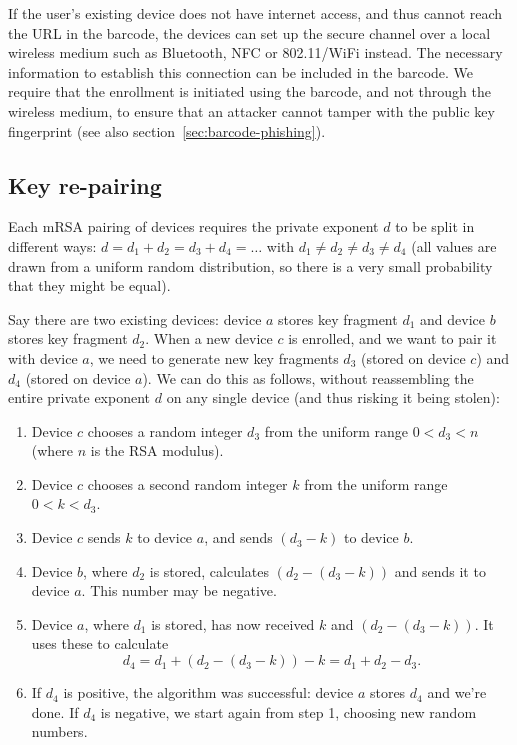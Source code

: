 If the user's existing device does not have internet access, and thus cannot reach the URL in the
barcode, the devices can set up the secure channel over a local wireless medium such as
Bluetooth, NFC or 802.11/WiFi instead. The necessary information to establish this connection can be
included in the barcode. We require that the enrollment is initiated using the barcode, and not
through the wireless medium, to ensure that an attacker cannot tamper with the public key
fingerprint (see also section~\ref{sec:barcode-phishing}).

\subsection{Key re-pairing}\label{sec:pairing}

Each mRSA pairing of devices requires the private exponent $d$ to be split in different ways:
$d = d_1 + d_2 = d_3 + d_4 = \dots$ with $d_1 \neq d_2 \neq d_3 \neq d_4$ (all values are drawn from
a uniform random distribution, so there is a very small probability that they might be equal).

Say there are two existing devices: device $a$ stores key fragment $d_1$ and device $b$ stores key
fragment $d_2$. When a new device $c$ is enrolled, and we want to pair it with device $a$, we need
to generate new key fragments $d_3$ (stored on device $c$) and $d_4$ (stored on device $a$). We can
do this as follows, without reassembling the entire private exponent $d$ on any single device (and
thus risking it being stolen):

\begin{enumerate}
\item Device $c$ chooses a random integer $d_3$ from the uniform range $0 < d_3 < n$ (where $n$ is
the RSA modulus).
\item Device $c$ chooses a second random integer $k$ from the uniform range $0 < k < d_3$.
\item Device $c$ sends $k$ to device $a$, and sends $(d_3 - k)$ to device $b$.
\item Device $b$, where $d_2$ is stored, calculates $(d_2 - (d_3 - k))$ and sends it to device $a$.
This number may be negative.
\item Device $a$, where $d_1$ is stored, has now received $k$ and $(d_2 - (d_3 - k))$. It uses these
to calculate $$d_4 = d_1 + (d_2 - (d_3 - k)) - k = d_1 + d_2 - d_3.$$
\item If $d_4$ is positive, the algorithm was successful: device $a$ stores $d_4$ and we're done. If
$d_4$ is negative, we start again from step 1, choosing new random numbers.
\end{enumerate}

